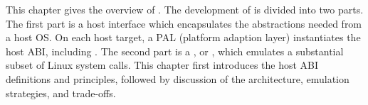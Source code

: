 This chapter gives the overview of \graphene{}.
The development of \graphene{} is divided into two parts.
The first part is a host interface which encapsulates the abstractions needed from a host OS.
On each host target, a PAL (platform adaption layer) instantiates the host ABI,
including \palcallnum{} \hostapis{}.
The second part is a \libos{}, or \thelibos{}, which emulates a substantial subset of Linux system calls.
This chapter first introduces the host ABI definitions and principles,
followed by discussion of the \thelibos{} architecture,
emulation strategies, %
and trade-offs.


